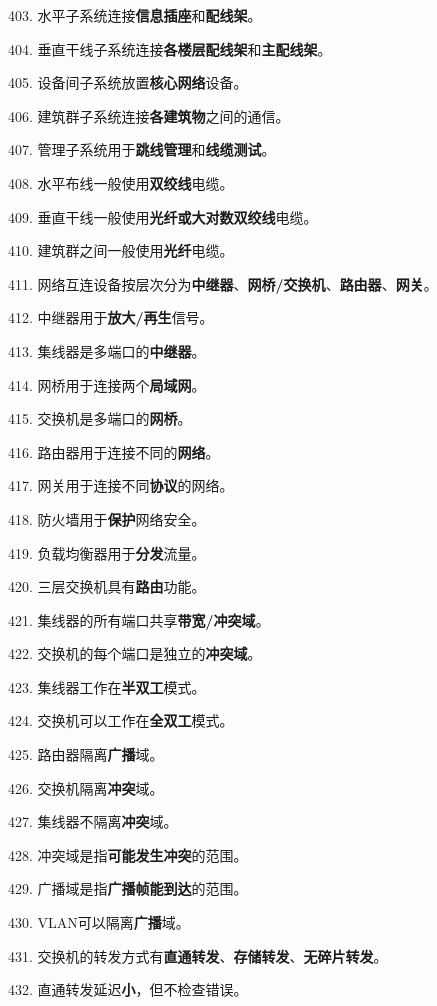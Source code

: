 \documentclass[12pt,a4paper,openany]{ctexbook}
\begin{document}
403. 水平子系统连接\textbf{信息插座}和\textbf{配线架}。

404. 垂直干线子系统连接\textbf{各楼层配线架}和\textbf{主配线架}。

405. 设备间子系统放置\textbf{核心网络}设备。

406. 建筑群子系统连接\textbf{各建筑物}之间的通信。

407. 管理子系统用于\textbf{跳线管理}和\textbf{线缆测试}。

408. 水平布线一般使用\textbf{双绞线}电缆。

409. 垂直干线一般使用\textbf{光纤或大对数双绞线}电缆。

410. 建筑群之间一般使用\textbf{光纤}电缆。

411. 网络互连设备按层次分为\textbf{中继器}、\textbf{网桥/交换机}、\textbf{路由器}、\textbf{网关}。

412. 中继器用于\textbf{放大/再生}信号。

413. 集线器是多端口的\textbf{中继器}。

414. 网桥用于连接两个\textbf{局域网}。

415. 交换机是多端口的\textbf{网桥}。

416. 路由器用于连接不同的\textbf{网络}。

417. 网关用于连接不同\textbf{协议}的网络。

418. 防火墙用于\textbf{保护}网络安全。

419. 负载均衡器用于\textbf{分发}流量。

420. 三层交换机具有\textbf{路由}功能。

421. 集线器的所有端口共享\textbf{带宽/冲突域}。

422. 交换机的每个端口是独立的\textbf{冲突域}。

423. 集线器工作在\textbf{半双工}模式。

424. 交换机可以工作在\textbf{全双工}模式。

425. 路由器隔离\textbf{广播}域。

426. 交换机隔离\textbf{冲突}域。

427. 集线器不隔离\textbf{冲突}域。

428. 冲突域是指\textbf{可能发生冲突}的范围。

429. 广播域是指\textbf{广播帧能到达}的范围。

430. VLAN可以隔离\textbf{广播}域。

431. 交换机的转发方式有\textbf{直通转发}、\textbf{存储转发}、\textbf{无碎片转发}。

432. 直通转发延迟\textbf{小}，但不检查错误。
\end{document}
